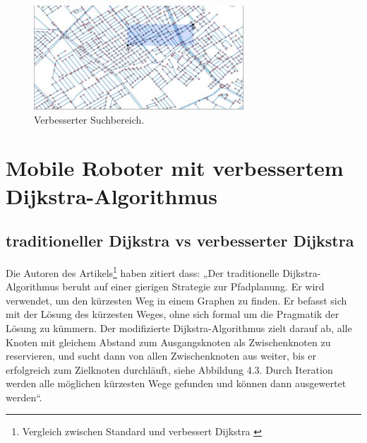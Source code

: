 \begin{figure}[H]
	\centering
	\includegraphics[width=0.7\textwidth]{images/GIS_blue.PNG}
	\caption{\label{fig:GIS_red}Verbesserter Suchbereich\cite{Research-id11}.}
\end{figure}

\section{Mobile Roboter mit verbessertem Dijkstra-Algorithmus}
\subsection{traditioneller Dijkstra vs verbesserter Dijkstra }

Die Autoren des Artikels\footnote{Vergleich zwischen Standard und verbessert Dijkstra \cite{vehicles3030027}} haben zitiert dass:
„Der traditionelle Dijkstra-Algorithmus beruht auf einer gierigen Strategie zur Pfadplanung. Er wird verwendet, um den kürzesten Weg in einem Graphen zu finden. Er befasst sich mit der Lösung des kürzesten Weges, ohne sich formal um die Pragmatik der Lösung zu kümmern.
\newline
\newline
 Der modifizierte Dijkstra-Algorithmus zielt darauf ab, alle Knoten mit gleichem Abstand zum Ausgangsknoten als Zwischenknoten zu reservieren, und sucht dann von allen Zwischenknoten aus weiter, bis er erfolgreich zum Zielknoten durchläuft, siehe Abbildung 4.3. Durch Iteration werden alle möglichen kürzesten Wege gefunden und können dann ausgewertet werden“.

